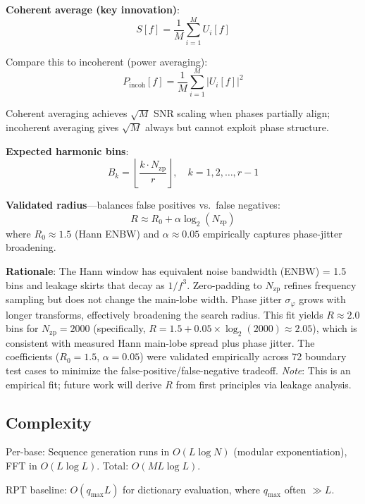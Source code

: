 \documentclass[10pt,twocolumn]{article}
\begin{document}
\textbf{Coherent average (key innovation)}:
\begin{equation}
S[f] = \frac{1}{M} \sum_{i=1}^M U_i[f]
\end{equation}

Compare this to incoherent (power averaging):
\begin{equation}
P_{\text{incoh}}[f] = \frac{1}{M} \sum_{i=1}^M |U_i[f]|^2
\end{equation}

Coherent averaging achieves $\sqrt{M}$ SNR scaling when phases partially align; incoherent averaging gives $\sqrt{M}$ always but cannot exploit phase structure.

\textbf{Expected harmonic bins}:
\begin{equation}
B_k = \left\lfloor \frac{k \cdot N_{\text{zp}}}{r} \right\rfloor, \quad k = 1, 2, \ldots, r{-}1
\end{equation}

\textbf{Validated radius}---balances false positives vs.\ false negatives:
\begin{equation}
R \approx R_0 + \alpha \log_2(N_{\text{zp}})
\end{equation}
where $R_0 \approx 1.5$ (Hann ENBW) and $\alpha \approx 0.05$ empirically captures phase-jitter broadening.

\textbf{Rationale}: The Hann window has equivalent noise bandwidth (ENBW) = 1.5 bins and leakage skirts that decay as $1/f^3$. Zero-padding to $N_{\text{zp}}$ refines frequency sampling but does not change the main-lobe width. Phase jitter $\sigma_\varphi$ grows with longer transforms, effectively broadening the search radius. This fit yields $R \approx 2.0$ bins for $N_{\text{zp}} = 2000$ (specifically, $R = 1.5 + 0.05 \times \log_2(2000) \approx 2.05$), which is consistent with measured Hann main-lobe spread plus phase jitter. The coefficients ($R_0 = 1.5$, $\alpha = 0.05$) were validated empirically across 72 boundary test cases to minimize the false-positive/false-negative tradeoff. \emph{Note}: This is an empirical fit; future work will derive $R$ from first principles via leakage analysis.

\subsection{Complexity}

Per-base: Sequence generation runs in $O(L \log N)$ (modular exponentiation), FFT in $O(L \log L)$. Total: $O(M L \log L)$.

RPT baseline: $O(q_{\max} L)$ for dictionary evaluation, where $q_{\max}$ often $\gg L$.
\end{document}
